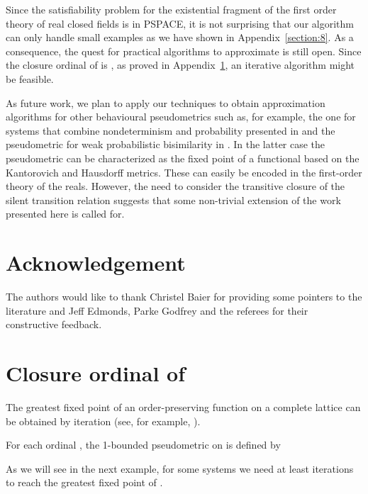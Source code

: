 \documentclass{LMCS}
\begin{document}
Since the satisfiability
problem for the existential fragment of the first order theory of
real closed fields is in \textsc{PSPACE}, it is not surprising that
our algorithm can only handle small examples as we have shown in
Appendix~\ref{section:8}.  As a consequence, the quest for practical
algorithms to approximate  is still open.  Since the closure
ordinal of  is , as proved in
Appendix~\ref{section:added}, an iterative algorithm might be feasible.

As future work, we plan to apply our techniques to obtain
approximation algorithms for other behavioural pseudometrics such as,
for example, the one for systems that combine nondeterminism and
probability presented in \cite{DCPP05:qapl} and the pseudometric for
weak probabilistic bisimilarity in \cite{DGJP02:lics}.  In the latter
case the pseudometric can be characterized as the fixed point of a
functional based on the Kantorovich and Hausdorff metrics.  These can
easily be encoded in the first-order theory of the reals.  However, the
need to consider the transitive closure of the silent transition relation
suggests that some non-trivial extension of the work presented here is
called for.

\section*{Acknowledgement}

The authors would like to thank Christel Baier for providing
some pointers to the literature and Jeff Edmonds, Parke Godfrey
and the referees for their constructive feedback.




\appendix

\section{Closure ordinal of }
\label{section:added}

The greatest fixed point of an order-preserving function on a complete lattice
can be obtained by iteration (see, for example, \cite[Exercise~4.13]{DP90}).

\begin{defi}
For each ordinal , the 1-bounded pseudometric  on 
is defined by

\end{defi}

As we will see in the next example, for some systems we need at least  iterations
to reach the greatest fixed point of .  
\end{document}
